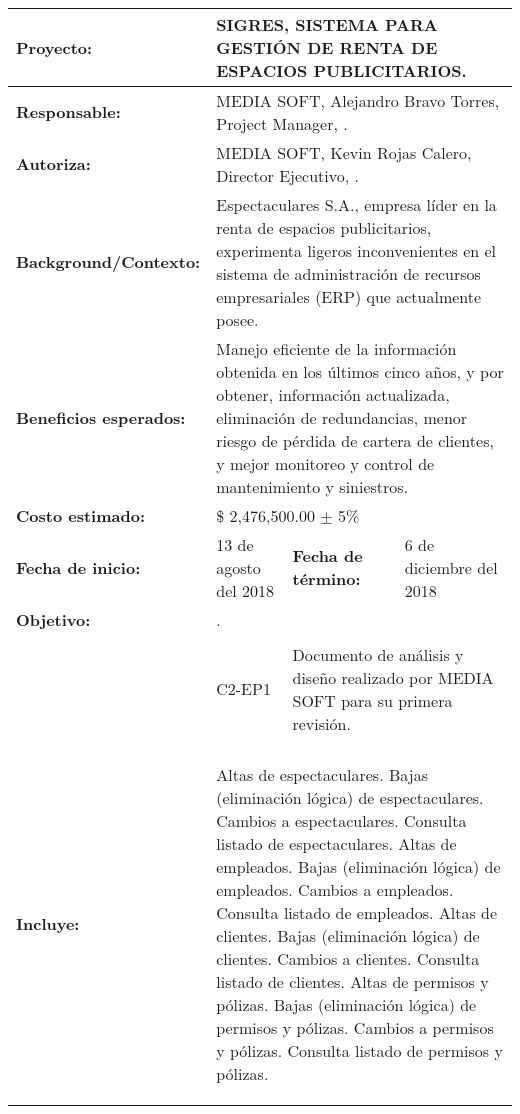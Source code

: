 
\newcommand{\ESCOMPchSec}[1]{\rowcolor{colorAgua}\multicolumn{4}{|c|}{\bf #1}\\\hline}
\newcommand{\ESCOMPchItem}[2]{{\bf {#1}} & \multicolumn{3}{p{.66\textwidth}|}{#2}\\\hline}
\newcommand{\ESCOMPchSubItem}[3]{{\bf {#1}} & {#2} & \multicolumn{2}{p{.44\textwidth}|}{#3}\\\hline}
\newcommand{\ESCOMPchSubSubItem}[4]{{\bf {#1}} & {#2} & {#3}& {#4}\\\hline}

\cleardoublepage
{\bigskip\\}
\begin{table}[hptb!] 
\begin{tabular}{|p{} |p{} |p{} |p{} |}
	\hline
	\ESCOMPchItem{Proyecto:}{SIGRES, SISTEMA PARA GESTIÓN DE RENTA DE ESPACIOS PUBLICITARIOS.}
	\ESCOMPchItem{Responsable:}{MEDIA SOFT, Alejandro Bravo Torres, Project Manager,  .}
	\ESCOMPchItem{Autoriza:}{MEDIA SOFT, Kevin Rojas Calero, Director Ejecutivo,   .}
	\ESCOMPchItem{Background/Contexto:}{Espectaculares S.A., empresa líder en la renta de espacios publicitarios, experimenta ligeros inconvenientes en el sistema de administración de recursos empresariales (ERP) que actualmente posee.}
	\ESCOMPchItem{Beneficios esperados:}{Manejo eficiente de la información obtenida en los últimos cinco años, y por obtener, información actualizada, eliminación de redundancias, menor riesgo de pérdida de cartera de clientes, y mejor monitoreo y control de mantenimiento y siniestros.}
	\ESCOMPchItem{Costo estimado:}{\$ 2,476,500.00 $\pm$ 5\%}
	\ESCOMPchSubSubItem{Fecha de inicio:}{13 de agosto del 2018}{\bf Fecha de término:}{6 de diciembre del 2018}
	\ESCOMPchItem{Objetivo:}{.}
	\ESCOMPchSec{Entregables Principales}
	\ESCOMPchSubItem{}{C2-EP1 }{Documento de análisis y diseño realizado por MEDIA SOFT para su primera revisión.}
	\ESCOMPchSec{Alcance del proyecto}
	\ESCOMPchItem{Incluye:}{
		\begin{Titemize}
			\Titem Altas de espectaculares.
			\Titem Bajas (eliminación lógica) de espectaculares.
			\Titem Cambios a espectaculares.
			\Titem Consulta listado de espectaculares.
			\Titem Altas de empleados.
			\Titem Bajas (eliminación lógica) de empleados.
			\Titem Cambios a empleados.
			\Titem Consulta listado de empleados.
			\Titem Altas de clientes.
			\Titem Bajas (eliminación lógica) de clientes.
			\Titem Cambios a clientes.
			\Titem Consulta listado de clientes.
			\Titem Altas de permisos y pólizas.
			\Titem Bajas (eliminación lógica) de permisos y pólizas.
			\Titem Cambios a permisos y pólizas.
			\Titem Consulta listado de permisos y pólizas.
		\end{Titemize}
	}
	\end{tabular}
	\label{tbl:projectCharter}
\end{table}
